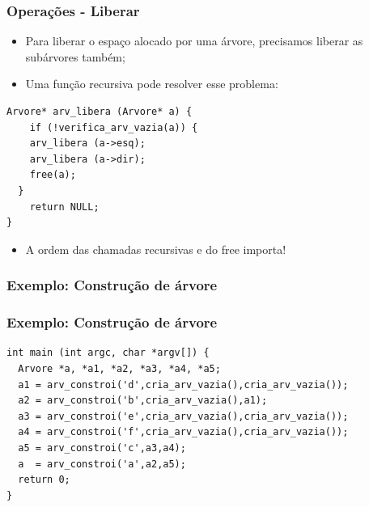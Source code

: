 \documentclass{beamer}
\begin{document}
\begin{frame}[fragile]
  \frametitle{Operações - Liberar}

  \begin{itemize}
    \item Para liberar o espaço alocado por uma árvore, precisamos liberar as subárvores também;
    \item Uma função recursiva pode resolver esse problema:
  \end{itemize}

  \begin{verbatim}
Arvore* arv_libera (Arvore* a) {
    if (!verifica_arv_vazia(a)) {
    arv_libera (a->esq);
    arv_libera (a->dir);
    free(a);
  }
    return NULL;
}
  \end{verbatim}
  
  \begin{itemize}
    \item A ordem das chamadas recursivas e do free importa! 
  \end{itemize}
\end{frame}

\begin{frame}[c]
  \frametitle{Exemplo: Construção de árvore}

  \centering

\end{frame}

\begin{frame}[fragile]
  \frametitle{Exemplo: Construção de árvore}

  \begin{verbatim}
int main (int argc, char *argv[]) {
  Arvore *a, *a1, *a2, *a3, *a4, *a5;
  a1 = arv_constroi('d',cria_arv_vazia(),cria_arv_vazia());
  a2 = arv_constroi('b',cria_arv_vazia(),a1);
  a3 = arv_constroi('e',cria_arv_vazia(),cria_arv_vazia());
  a4 = arv_constroi('f',cria_arv_vazia(),cria_arv_vazia());
  a5 = arv_constroi('c',a3,a4);
  a  = arv_constroi('a',a2,a5);
  return 0;
}
  \end{verbatim}
\end{frame}
\end{document}
